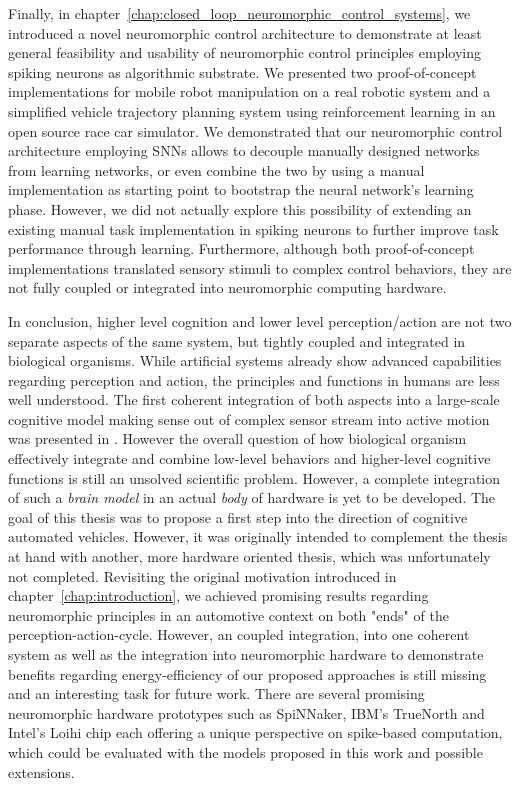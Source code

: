 Finally, in chapter~\ref{chap:closed_loop_neuromorphic_control_systems}, we introduced a novel neuromorphic control architecture to demonstrate at least general feasibility and usability of neuromorphic control principles employing spiking neurons as algorithmic substrate.
We presented two proof-of-concept implementations for mobile robot manipulation on a real robotic system and a simplified vehicle trajectory planning system using reinforcement learning in an open source race car simulator.
We demonstrated that our neuromorphic control architecture employing \acp{SNN} allows to decouple manually designed networks from learning networks, or even combine the two by using a manual implementation as starting point to bootstrap the neural network's learning phase.
However, we did not actually explore this possibility of extending an existing manual task implementation in spiking neurons to further improve task performance through learning.
Furthermore, although both proof-of-concept implementations translated sensory stimuli to complex control behaviors, they are not fully coupled or integrated into neuromorphic computing hardware.

In conclusion, higher level cognition and lower level perception/action are not two separate aspects of the same system, but tightly coupled and integrated in biological organisms.
While artificial systems already show advanced capabilities regarding perception and action, the principles and functions in humans are less well understood.
The first coherent integration of both aspects into a large-scale cognitive model making sense out of complex sensor stream into active motion was presented in \textcite{Eliasmith2012}.
However the overall question of how biological organism effectively integrate and combine low-level behaviors and higher-level cognitive functions is still an unsolved scientific problem.
However, a complete integration of such a \emph{brain model} in an actual \emph{body} of hardware is yet to be developed.
The goal of this thesis was to propose a first step into the direction of cognitive automated vehicles.
However, it was originally intended to complement the thesis at hand with another, more hardware oriented thesis, which was unfortunately not completed.
Revisiting the original motivation introduced in chapter~\ref{chap:introduction}, we achieved promising results regarding neuromorphic principles in an automotive context on both "ends" of the perception-action-cycle.
However, an coupled integration, into one coherent system as well as the integration into neuromorphic hardware to demonstrate benefits regarding energy-efficiency of our proposed approaches is still missing and an interesting task for future work.
There are several promising neuromorphic hardware prototypes such as \ac{SpiNNaker}, IBM's TrueNorth and Intel's Loihi chip each offering a unique perspective on spike-based computation, which could be evaluated with the models proposed in this work and possible extensions.


